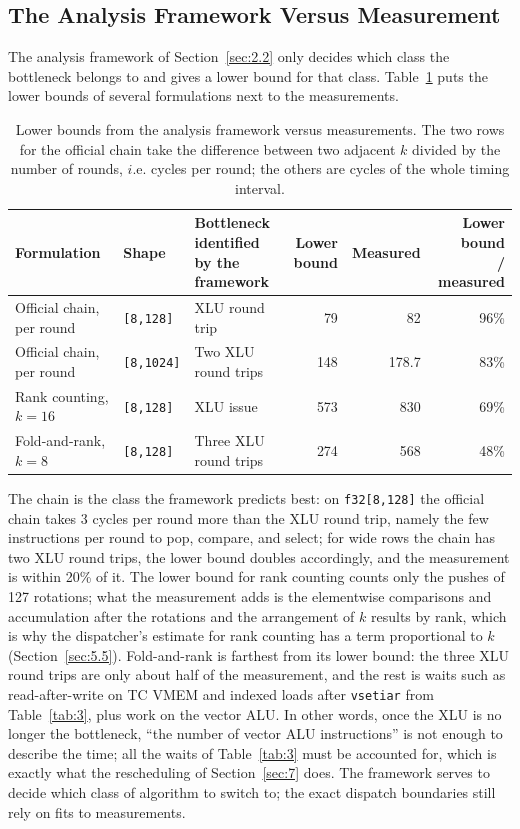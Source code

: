 \documentclass[sigconf,nonacm,balance=false]{acmart}
\newcommand{\code}[1]{\texttt{#1}}
\begin{document}
\subsection{The Analysis Framework Versus Measurement}
\label{sec:8.2}

The analysis framework of Section~\ref{sec:2.2} only decides which class the bottleneck belongs to and gives a lower bound for that class. Table~\ref{tab:19} puts the lower bounds of several formulations next to the measurements.

\begin{table}
\centering
\caption{Lower bounds from the analysis framework versus measurements. The two rows for the official chain take the difference between two adjacent $k$ divided by the number of rounds, $i$.e. cycles per round; the others are cycles of the whole timing interval.}
\label{tab:19}
\begin{tabular}{lllrrr}
\toprule
Formulation & Shape & \makecell[lb]{Bottleneck identified\\by the framework} & \makecell[rb]{Lower\\bound} & Measured & \makecell[rb]{Lower bound\\/ measured} \\
\midrule
Official chain, per round & \code{[8,\allowbreak{}128]} & XLU round trip & 79 & 82 & 96\% \\
Official chain, per round & \code{[8,\allowbreak{}1024]} & Two XLU round trips & 148 & 178.7 & 83\% \\
Rank counting, $k = 16$ & \code{[8,\allowbreak{}128]} & XLU issue & 573 & 830 & 69\% \\
Fold-and-rank, $k = 8$ & \code{[8,\allowbreak{}128]} & Three XLU round trips & 274 & 568 & 48\% \\
\bottomrule
\end{tabular}
\end{table}

The chain is the class the framework predicts best: on \code{f32[8,\allowbreak{}128]} the official chain takes 3 cycles per round more than the XLU round trip, namely the few instructions per round to pop, compare, and select; for wide rows the chain has two XLU round trips, the lower bound doubles accordingly, and the measurement is within 20\% of it. The lower bound for rank counting counts only the pushes of 127 rotations; what the measurement adds is the elementwise comparisons and accumulation after the rotations and the arrangement of $k$ results by rank, which is why the dispatcher's estimate for rank counting has a term proportional to $k$ (Section~\ref{sec:5.5}). Fold-and-rank is farthest from its lower bound: the three XLU round trips are only about half of the measurement, and the rest is waits such as read-after-write on TC VMEM and indexed loads after \code{vsetiar} from Table~\ref{tab:3}, plus work on the vector ALU. In other words, once the XLU is no longer the bottleneck, ``the number of vector ALU instructions'' is not enough to describe the time; all the waits of Table~\ref{tab:3} must be accounted for, which is exactly what the rescheduling of Section~\ref{sec:7} does. The framework serves to decide which class of algorithm to switch to; the exact dispatch boundaries still rely on fits to measurements.
\end{document}
